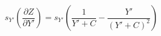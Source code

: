 

\[
s_{Y'} (\frac{\partial Z} {\partial Y'})= s_{Y'}(\frac {1} {Y' + C} - \frac{Y'} {(Y' + C)^{2}})

\]


